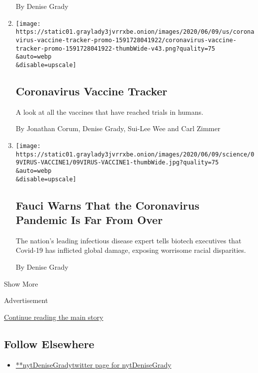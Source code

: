 \begin{enumerate}
  By Denise Grady
\item
  \href{/interactive/2020/science/coronavirus-vaccine-tracker.html}{}

  \texttt{[image: https://static01.graylady3jvrrxbe.onion/images/2020/06/09/us/coronavirus-vaccine-tracker-promo-1591728041922/coronavirus-vaccine-tracker-promo-1591728041922-thumbWide-v43.png?quality=75\\\&auto=webp\\\&disable=upscale]}

  \hypertarget{coronavirus-vaccine-tracker}{%
  \subsection{Coronavirus Vaccine
  Tracker}\label{coronavirus-vaccine-tracker}}

  A look at all the vaccines that have reached trials in humans.

  By Jonathan Corum, Denise Grady, Sui-Lee Wee and Carl Zimmer
\item
  \href{/2020/06/09/health/fauci-vaccines-coronavirus.html}{}

  \texttt{[image: https://static01.graylady3jvrrxbe.onion/images/2020/06/09/science/09VIRUS-VACCINE1/09VIRUS-VACCINE1-thumbWide.jpg?quality=75\\\&auto=webp\\\&disable=upscale]}

  \hypertarget{fauci-warns-that-the-coronavirus-pandemic-is-far-from-over}{%
  \subsection{Fauci Warns That the Coronavirus Pandemic Is Far From
  Over}\label{fauci-warns-that-the-coronavirus-pandemic-is-far-from-over}}

  The nation's leading infectious disease expert tells biotech
  executives that Covid-19 has inflicted global damage, exposing
  worrisome racial disparities.

  By Denise Grady
\end{enumerate}

Show More

Advertisement

\protect\hyperlink{after-mid2}{Continue reading the main story}

\hypertarget{follow-elsewhere}{%
\subsection{Follow Elsewhere}\label{follow-elsewhere}}

\begin{itemize}
\tightlist
\item
  \href{https://twitter.com/nytDeniseGrady}{**nytDeniseGradytwitter page
  for nytDeniseGrady}
\end{itemize}

